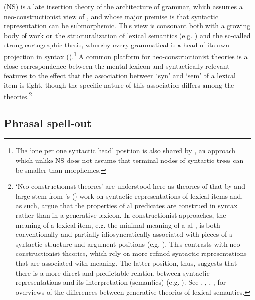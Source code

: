  (NS) is a late insertion theory of the architecture of grammar, which assumes a neo-constructionist view of , and whose major premise is that syntactic representation can be submorphemic. This view is consonant both with a growing body of work on the structuralization of lexical semantics (e.g. \citealt{Borer2005,Ramchand08}) and the so-called strong cartographic  thesis, whereby every grammatical  is a head of its own projection in syntax (\citealt[50]{CinqueRizzi2008}).\footnote{The `one  per one syntactic head' position is also shared by \cite{Kayne2005}, an approach which unlike NS does not assume that terminal nodes of syntactic trees can be smaller than morphemes. 
} %
 A common platform for neo-constructionist theories is a close correspondence between the mental lexicon and  syntactically relevant features to the effect that the association between `syn' and `sem' of a lexical item is tight, though the specific nature of this association differs among the theories.\footnote{`Neo-constructionist theories' are understood here as theories of  that by and large stem from \citeauthor{HK1993}'s (\citeyear{HK1993,HK2002}) work on syntactic representations of lexical items and, as such, argue that the properties of al predicates are construed in syntax rather than in a generative lexicon. 
 In constructionist approaches, the meaning of a lexical item, e.g. the minimal meaning of a al , is both conventionally and partially idiosyncratically associated with pieces of a syntactic structure and argument positions (e.g. \citealt{Goldberg1995,Goldberg2006,Booij2002,Jackendoff2002,Goldberg-Jackendoff2004}). This contrasts with neo-constructionist theories, which rely on more refined syntactic representations that are associated with meaning. The latter position, thus, suggests that there is a more direct and predictable relation between syntactic representations and its interpretation (semantics) (e.g. \citealt{Mateu2002,Borer2003,Borer2005,Ramchand08}).
 See \cite{Levin-Rapp2005}, \citet[19--48]{Acedo2010}, \cite{Ramchand2013}, \cite{Mateu2014}, \cite{Acquaviva-etal-2018} for overviews of the differences between generative theories of lexical semantics.  
} %

\subsection{Phrasal spell-out}


